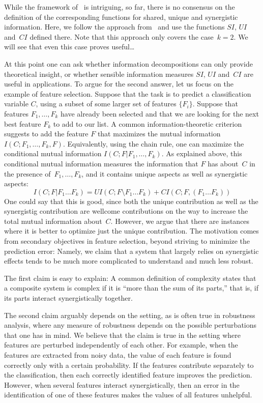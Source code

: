 \documentclass{article}
\begin{document}
While the framework of~\cite{WilliamsBeer:Nonneg_Decomposition_of_Multiinformation} is intriguing, so far, there is no
consensus on the definition of the corresponding functions for shared, unique and synergistic information.  Here, we
follow the approach from~\cite{BROJA13:Quantifying_unique_information} and use the functions $SI$, $UI$ and~$CI$ defined
there.  Note that this approach only covers the case~$k=2$.  We will see that even this case proves useful\dots

At this point one can ask whether information decompositions can only provide theoretical insight, or whether sensible
information measures $SI$, $UI$ and~$CI$ are useful in applications.  To argue for the second answer, let us focus on
the example of feature selection.  Suppose that the task is to predict a classification variable $C$, using a subset of
some larger set of features $\{F_{i}\}$.  Suppose that features $F_{1},\dots,F_{k}$ have already been selected and that
we are looking for the next best feature $F_{k}$ to add to our list.  A common information-theoretic criterion suggests
to add the feature $F$ that maximizes the mutual information~$I(C; F_{1},\dots,F_{k},F)$.  Equivalently, using the chain
rule, one can maximize the conditional mutual information $I(C; F|F_{1},\dots,F_{k})$.  As explained above, this
conditional mutual information measures the information that $F$ has about~$C$ in the presence of~$F_{1},\dots,F_{k}$,
and it contains unique aspects as well as synergistic aspects:
\begin{equation*}
  I(C; F|F_{1}\dots F_{k}) = UI(C; F\setminus F_{1}\dots F_{k}) + CI(C;F, (F_{1}\dots F_{k}))
\end{equation*}
One could say that this is good, since both the unique contribution as well as the synergistig contribution are wellcome
contributions on the way to increase the total mutual information about~$C$.  However, we argue that there are instances
where it is better to optimize just the unique contribution.  The motivation comes from secondary objectives in feature
selection, beyond striving to minimize the prediction error: Namely, we claim that a system that largely relies on
synergistic effects tends to be much more complicated to understand and much less robust.

The first claim is easy to explain: A common definition of complexity states that a composite system is complex if it is
``more than the sum of its parts,'' that is, if its parts interact synergistically together.

The second claim arguably depends on the setting, as is often true in robustness analysis, where any measure of
robustness depends on the possible perturbations that one has in mind.  We believe that the claim is true in the setting
where features are perturbed independently of each other.  For example, when the features are extracted from noisy data,
the value of each feature is found correctly only with a certain probability.  If the features contribute separately to
the classification, then each correctly identified feature improves the prediction.  However, when several features
interact synergistically, then an error in the identification of one of these features makes the values of all features
unhelpful.
\end{document}
